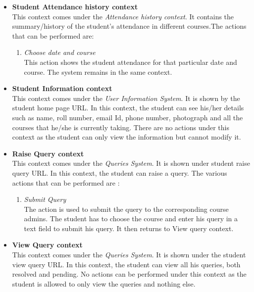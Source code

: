 \documentclass[paper=a4, fontsize=15pt]{scrartcl}
\begin{document}
\begin{itemize}
    \item \textbf{Student Attendance history context}\\
    This context comes under the \textit{Attendance history context}. It contains the summary/history of the student's attendance in different courses.The actions that can be performed are:
   \begin{enumerate}
        \item \textit{Choose date and course}\\
        This action shows the student attendance for that particular date and course. The system remains in the same context.
    \end{enumerate}  
    
    
   
    \item \textbf{Student Information context}\\
    This context comes under the \textit{User Information System}. It is shown by the student home page URL. In this context, the student can see his/her details such as name, roll number, email Id, phone number, photograph and all the courses that he/she is currently taking. There are no actions under this context as the student can only view the information but cannot modify it.
    
    
    



    \item \textbf{Raise Query context}\\
    This context comes under the \textit{Queries System}. It is shown under student raise query URL. In this context, the student can raise a query. The various actions that can be performed are : 
    \begin{enumerate}
        \item \textit{Submit Query}\\
        The action is used to submit the query to the corresponding course admins. The student has to choose the course and enter his query in a text field to submit his query. It then returns to View query context.
        
    \end{enumerate}
        

    
    
    


    \item \textbf{View Query context}\\
    This context comes under the \textit{Queries System}. It is shown under the student view query URL. In this context, the student can view all his queries, both resolved and pending. No actions can be performed under this context as the student is allowed to only view the queries and nothing else.
        


\end{itemize}
\end{document}
